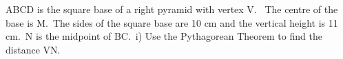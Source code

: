 \documentclass[preview]{standalone}
\begin{document}
\begin{center}
\begin{minipage}{12cm}
\raggedright ABCD is the square base of a right pyramid with vertex V. \
 The centre of the base is M.\
 The sides of the square base are 10 cm and the vertical height is 11 cm.\
 N is the midpoint of BC.\
 i) Use the Pythagorean Theorem to find the distance VN.
\end{minipage}
\end{center}
\end{document}
